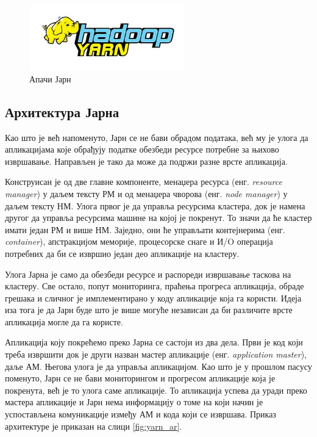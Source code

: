 \documentclass[12pt,oneside]{memoir}
\begin{document}
\begin{figure}[!ht]
  \centering
  \includegraphics[width=0.6\textwidth]{pictures/yarn_logo.jpg}
  \caption{Апачи Јарн}
  \label{fig:yarn_logo}
\end{figure}

\subsection{Архитектура Јарна}
\label{subsec:yern_arch}

Као што је већ напоменуто, Јарн се не бави обрадом података, већ му је улога да апликацијама које обрађују податке обезбеди ресурсе потребне за њихово извршавање. Направљен је тако да може да подржи разне врсте апликација. \cite{hadoop_learning}

Конструисан је од две главне компоненте, менаџера ресурса (енг. \textit{resource manager}) у даљем тексту РМ и од менаџера чворова (енг. \textit{node manager}) у даљем тексту НМ. Улога првог је да управља ресурсима кластера, док је намена другог да управља ресурсима машине на којој је покренут. То значи да ће кластер имати један РМ и више НМ. Заједно, они ће управљати контејнерима (енг. \textit{container}), апстракцијом меморије, процесорске снаге и И/O операција потребних да би се извршио један део апликације на кластеру. \cite{hadoop_learning}

Улога Јарна је само да обезбеди ресурсе и распореди извршавање таскова на кластеру. Све остало, попут мониторинга, праћења прогреса апликација, обраде грешака и сличног је имплементирано у коду апликације која га користи. Идеја иза тога је да Јарн буде што је више могуће независан да би различите врсте апликација могле да га користе. \cite{hadoop_learning}

Апликација коју покрећемо преко Јарна се састоји из два дела. Први је код који треба извршити док је други назван мастер апликације (енг. \textit{application master}), даље АМ. Његова улога је да управља апликацијом. Као што је у прошлом пасусу поменуто, Јарн се не бави мониторингом и прогресом апликације која је покренута, већ је то улога саме апликације. То апликација успева да уради преко мастера апликације и Јарн нема информацију о томе на који начин је успостављена комуникације између АМ и кода који се извршава. Приказ архитектуре је приказан на слици \ref{fig:yarn_ar}. \cite{hadoop_learning}
\end{document}
